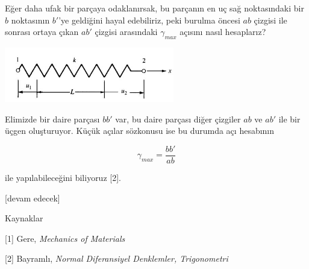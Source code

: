 \documentclass[12pt,fleqn]{article}\usepackage{../../common}
\begin{document}
Eğer daha ufak bir parçaya odaklanırsak, bu parçanın en uç sağ noktasındaki
bir $b$ noktasının $b'$'ye geldiğini hayal edebiliriz, peki burulma öncesi $ab$
çizgisi ile sonrası ortaya çıkan $ab'$ çizgisi arasındaki  $\gamma_{max}$
açısını nasıl hesaplarız? 

\includegraphics[width=20em]{phy_020_strs_06_04.jpg}

Elimizde bir daire parçası $bb'$ var, bu daire parçası diğer çizgiler $ab$
ve $ab'$ ile bir üçgen oluşturuyor. Küçük açılar sözkonusu ise bu durumda
açı hesabının

$$
\gamma_{max} = \frac{bb'}{ab}
$$

ile yapılabileceğini biliyoruz [2].

[devam edecek]

Kaynaklar

[1] Gere, {\em Mechanics of Materials}

[2] Bayramlı, {\em Normal Diferansiyel Denklemler, Trigonometri}
\end{document}
